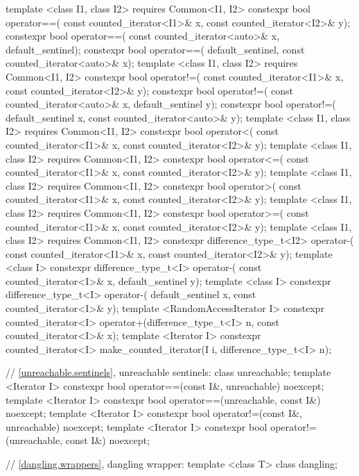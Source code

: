 \begin{codeblock}
{{{{  template <class I1, class I2>
      requires Common<I1, I2>
    constexpr bool operator==(
      const counted_iterator<I1>& x, const counted_iterator<I2>& y);
  constexpr bool operator==(
    const counted_iterator<auto>& x, default_sentinel);
  constexpr bool operator==(
    default_sentinel, const counted_iterator<auto>& x);
  template <class I1, class I2>
      requires Common<I1, I2>
    constexpr bool operator!=(
      const counted_iterator<I1>& x, const counted_iterator<I2>& y);
  constexpr bool operator!=(
    const counted_iterator<auto>& x, default_sentinel y);
  constexpr bool operator!=(
    default_sentinel x, const counted_iterator<auto>& y);
  template <class I1, class I2>
      requires Common<I1, I2>
    constexpr bool operator<(
      const counted_iterator<I1>& x, const counted_iterator<I2>& y);
  template <class I1, class I2>
      requires Common<I1, I2>
    constexpr bool operator<=(
      const counted_iterator<I1>& x, const counted_iterator<I2>& y);
  template <class I1, class I2>
      requires Common<I1, I2>
    constexpr bool operator>(
      const counted_iterator<I1>& x, const counted_iterator<I2>& y);
  template <class I1, class I2>
      requires Common<I1, I2>
    constexpr bool operator>=(
      const counted_iterator<I1>& x, const counted_iterator<I2>& y);
  template <class I1, class I2>
      requires Common<I1, I2>
    constexpr difference_type_t<I2> operator-(
      const counted_iterator<I1>& x, const counted_iterator<I2>& y);
  template <class I>
    constexpr difference_type_t<I> operator-(
      const counted_iterator<I>& x, default_sentinel y);
  template <class I>
    constexpr difference_type_t<I> operator-(
      default_sentinel x, const counted_iterator<I>& y);
  template <RandomAccessIterator I>
    constexpr counted_iterator<I>
      operator+(difference_type_t<I> n, const counted_iterator<I>& x);
  template <Iterator I>
    constexpr counted_iterator<I> make_counted_iterator(I i, difference_type_t<I> n);

  // \ref{unreachable.sentinels}, unreachable sentinels:
  class unreachable;
  template <Iterator I>
    constexpr bool operator==(const I&, unreachable) noexcept;
  template <Iterator I>
    constexpr bool operator==(unreachable, const I&) noexcept;
  template <Iterator I>
    constexpr bool operator!=(const I&, unreachable) noexcept;
  template <Iterator I>
    constexpr bool operator!=(unreachable, const I&) noexcept;

  // \ref{dangling.wrappers}, dangling wrapper:
  template <class T> class dangling;

}}}}
\end{codeblock}
